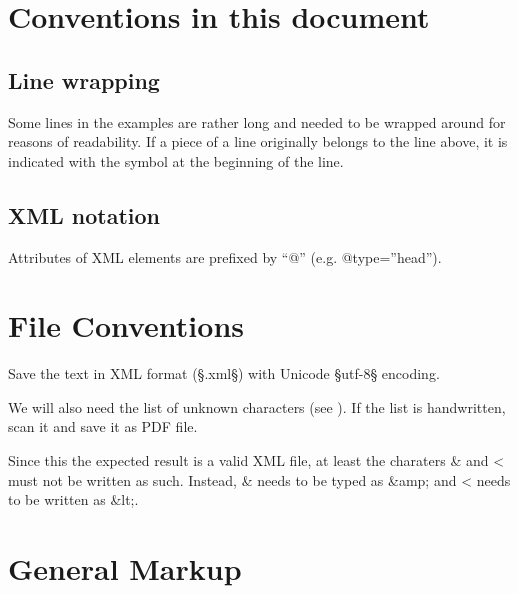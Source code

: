 


\section{Conventions in this document}
\label{sec:conv-this-docum}

\subsection{Line wrapping}
\label{sec:line-wrapping}

Some lines in the examples are rather long and needed to be wrapped around for reasons of readability. If a piece of a line originally belongs to the line above, it is indicated with the symbol  at the beginning of the line.

\subsection{XML notation}
\label{sec:xml-notation}

Attributes of XML elements are prefixed by ``@'' (e.g. @type=”head”).
\section{File Conventions}
\label{section file conventions}

\begin{mainruleLessImportant}
Save the text in XML format (§.xml§) with Unicode §utf-8§ encoding.

We will also need the list of unknown characters (see ). If the list is handwritten, scan it and save it as PDF file.
\end{mainruleLessImportant}

Since this the expected result is a valid XML file, at least the charaters \& and < must not be written as such. Instead, \& needs to be typed as \&amp; and < needs to be written as \&lt;.


\section{General Markup}

